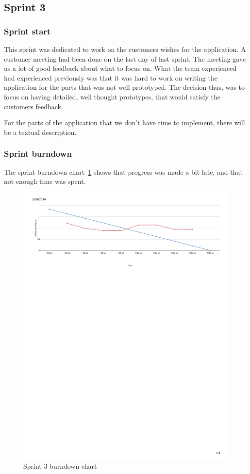 \subsection{Sprint 3}
\subsubsection{Sprint start}
This sprint was dedicated to work on the customers wishes for the application. A customer meeting had been done on the last day of last sprint. The meeting gave us a lot of good feedback about what to focus on.
What the team experienced had experienced previously was that it was hard to work on writing the application for the parts that was not well prototyped.
The decision thus, was to focus on having detailed, well thought prototypes, that would satisfy the customers feedback. 

For the parts of the application that we don't have time to implement, there will be a textual description.

\subsubsection{Sprint burndown}

The sprint burndown chart~\ref{fig:sprint3burndown} shows that progress was made a bit late, and that not enough time was spent.

\begin{figure}[H]
\includegraphics[width=\textwidth, trim= 1cm 21cm 1cm 1cm, clip=true]{ch/projectManagement/fig/burndown3.pdf}
\caption{Sprint 3 burndown chart}
\label{fig:sprint3burndown}
\end{figure}


